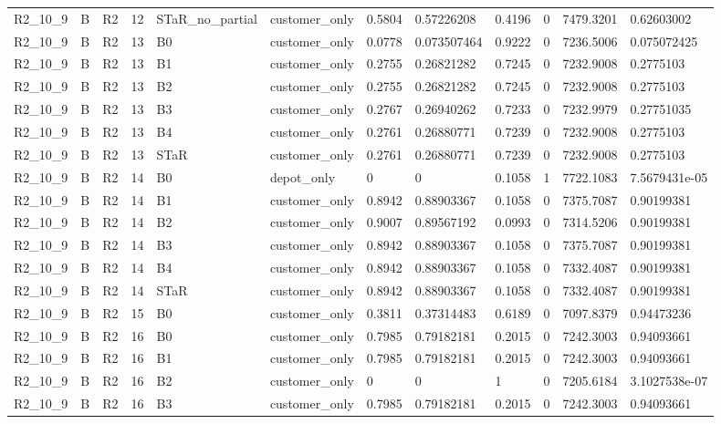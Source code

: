 \begin{longtable}{llllllllllll}
R2\_10\_9 & B & R2 & 12 & STaR\_no\_partial & customer\_only & 0.5804 & 0.57226208 & 0.4196 & 0 & 7479.3201 & 0.62603002 \\
R2\_10\_9 & B & R2 & 13 & B0 & customer\_only & 0.0778 & 0.073507464 & 0.9222 & 0 & 7236.5006 & 0.075072425 \\
R2\_10\_9 & B & R2 & 13 & B1 & customer\_only & 0.2755 & 0.26821282 & 0.7245 & 0 & 7232.9008 & 0.2775103 \\
R2\_10\_9 & B & R2 & 13 & B2 & customer\_only & 0.2755 & 0.26821282 & 0.7245 & 0 & 7232.9008 & 0.2775103 \\
R2\_10\_9 & B & R2 & 13 & B3 & customer\_only & 0.2767 & 0.26940262 & 0.7233 & 0 & 7232.9979 & 0.27751035 \\
R2\_10\_9 & B & R2 & 13 & B4 & customer\_only & 0.2761 & 0.26880771 & 0.7239 & 0 & 7232.9008 & 0.2775103 \\
R2\_10\_9 & B & R2 & 13 & STaR & customer\_only & 0.2761 & 0.26880771 & 0.7239 & 0 & 7232.9008 & 0.2775103 \\
R2\_10\_9 & B & R2 & 14 & B0 & depot\_only & 0 & 0 & 0.1058 & 1 & 7722.1083 & 7.5679431e-05 \\
R2\_10\_9 & B & R2 & 14 & B1 & customer\_only & 0.8942 & 0.88903367 & 0.1058 & 0 & 7375.7087 & 0.90199381 \\
R2\_10\_9 & B & R2 & 14 & B2 & customer\_only & 0.9007 & 0.89567192 & 0.0993 & 0 & 7314.5206 & 0.90199381 \\
R2\_10\_9 & B & R2 & 14 & B3 & customer\_only & 0.8942 & 0.88903367 & 0.1058 & 0 & 7375.7087 & 0.90199381 \\
R2\_10\_9 & B & R2 & 14 & B4 & customer\_only & 0.8942 & 0.88903367 & 0.1058 & 0 & 7332.4087 & 0.90199381 \\
R2\_10\_9 & B & R2 & 14 & STaR & customer\_only & 0.8942 & 0.88903367 & 0.1058 & 0 & 7332.4087 & 0.90199381 \\
R2\_10\_9 & B & R2 & 15 & B0 & customer\_only & 0.3811 & 0.37314483 & 0.6189 & 0 & 7097.8379 & 0.94473236 \\
R2\_10\_9 & B & R2 & 16 & B0 & customer\_only & 0.7985 & 0.79182181 & 0.2015 & 0 & 7242.3003 & 0.94093661 \\
R2\_10\_9 & B & R2 & 16 & B1 & customer\_only & 0.7985 & 0.79182181 & 0.2015 & 0 & 7242.3003 & 0.94093661 \\
R2\_10\_9 & B & R2 & 16 & B2 & customer\_only & 0 & 0 & 1 & 0 & 7205.6184 & 3.1027538e-07 \\
R2\_10\_9 & B & R2 & 16 & B3 & customer\_only & 0.7985 & 0.79182181 & 0.2015 & 0 & 7242.3003 & 0.94093661 \\

\end{longtable}
